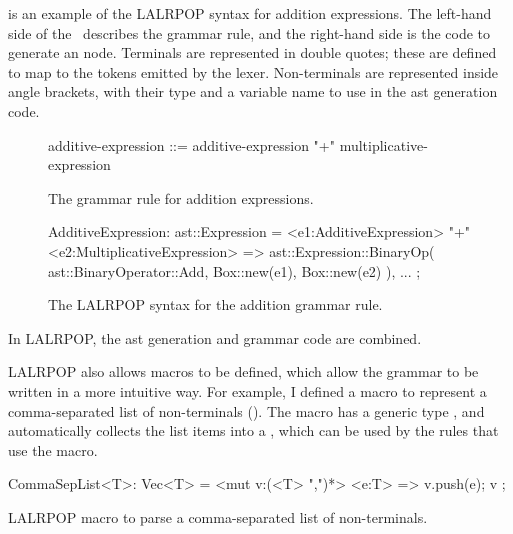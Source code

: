 \documentclass[00-main.tex]{subfiles}
\begin{document}
 is an example of the LALRPOP syntax for addition expressions.
The left-hand side of the~\RustInline{=>} describes the grammar rule, and the right-hand side is the code to generate an  node.
Terminals are represented in double quotes; these are defined to map to the tokens emitted by the lexer.
Non-terminals are represented inside angle brackets, with their type and a variable name to use in the \gls{ast} generation code.

\begin{listing}[!ht]
  \begin{subfigure}[t]{\textwidth}
    \begin{GrammarListing}
      additive-expression ::= additive-expression "+" multiplicative-expression
    \end{GrammarListing}
    \caption{The grammar rule for addition expressions.}
  \end{subfigure}
  \par\medskip %
  \begin{subfigure}[t]{\textwidth}
    \begin{RustListing}
      AdditiveExpression: ast::Expression = {
          <e1:AdditiveExpression> "+" <e2:MultiplicativeExpression>
              => ast::Expression::BinaryOp(
                  ast::BinaryOperator::Add,
                  Box::new(e1),
                  Box::new(e2)
              ),
          ...
      };
    \end{RustListing}
    \caption{The LALRPOP syntax for the addition grammar rule.}
  \end{subfigure}
  \caption{In LALRPOP, the \gls{ast} generation and grammar code are combined.}
  \label{lst:AST generation code example}
\end{listing}

LALRPOP also allows macros to be defined, which allow the grammar to be written in a more intuitive way.
For example, I defined a macro to represent a comma-separated list of non-terminals ().
The macro has a generic type , and automatically collects the list items into a , which can be used by the rules that use the macro.

\begin{listing}[!ht]
  \begin{RustListing}
    CommaSepList<T>: Vec<T> = {
        <mut v:(<T> ",")*> <e:T> => {
            v.push(e);
            v
        }
    };
  \end{RustListing}
  \caption{LALRPOP macro to parse a comma-separated list of non-terminals.}
  \label{lst:parser macro for comma-separated list}
\end{listing}
\end{document}
